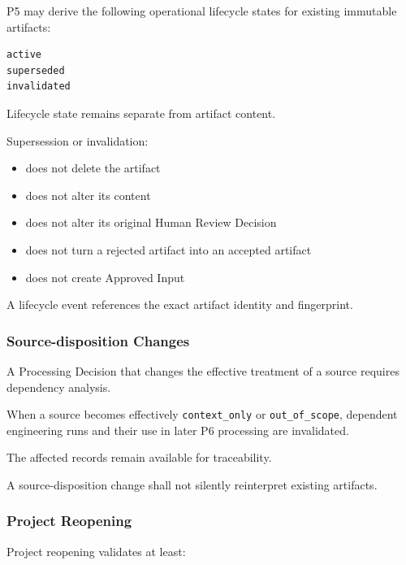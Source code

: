 P5 may derive the following operational lifecycle states for existing immutable artifacts:

\begin{verbatim}
active
superseded
invalidated
\end{verbatim}

Lifecycle state remains separate from artifact content.

Supersession or invalidation:

\begin{itemize}
\tightlist
\item
  does not delete the artifact
\item
  does not alter its content
\item
  does not alter its original Human Review Decision
\item
  does not turn a rejected artifact into an accepted artifact
\item
  does not create Approved Input
\end{itemize}

A lifecycle event references the exact artifact identity and fingerprint.

\hypertarget{source-disposition-changes}{%
\subsubsection{Source-disposition Changes}\label{source-disposition-changes}}

A Processing Decision that changes the effective treatment of a source requires dependency analysis.

When a source becomes effectively \texttt{context\_only} or \texttt{out\_of\_scope}, dependent engineering runs and their use in later P6 processing are invalidated.

The affected records remain available for traceability.

A source-disposition change shall not silently reinterpret existing artifacts.

\hypertarget{project-reopening}{%
\subsubsection{Project Reopening}\label{project-reopening}}

Project reopening validates at least:

